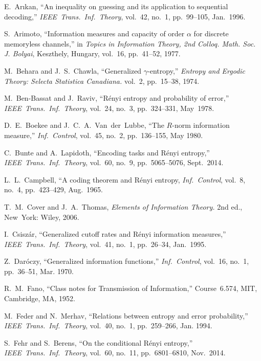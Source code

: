 \documentclass[conference, draftcls, onecolumn]{IEEEtran}
\theoremstyle{plain}
\begin{document}
\begin{thebibliography}{99}

E.~Ar{\i}kan,
``An inequality on guessing and its application to sequential decoding,''
\emph{IEEE\ Trans.\ Inf.\ Theory},
vol.~42, no.~1, pp.~99--105, Jan.~1996.

S.~Arimoto,
``Information measures and capacity of order $\alpha$ for discrete memoryless channels,''
in \emph{Topics in Information Theory, 2nd Colloq. Math. Soc. J. Bolyai},
Keszthely, Hungary, vol.~16, pp.~41--52, 1977.

M.~Behara and J.~S.~Chawla,
``Generalized $\gamma$-entropy,''
\emph{Entropy and Ergodic Theory: Selecta Statistica Canadiana.}
vol.~2, pp.~15--38, 1974.

M.~Ben-Bassat and J.~Raviv,
``R\'{e}nyi entropy and probability of error,''
\emph{IEEE\ Trans.\ Inf.\ Theory},
vol.~24, no.~3, pp.~324--331, May~1978.

D.~E.~Boekee and J.~C.~A.~Van~der~Lubbe,
``The $R$-norm information measure,''
\emph{Inf.\ Control},
vol.~45, no.~2, pp.~136--155, May 1980.

C.~Bunte and A.~Lapidoth,
``Encoding tasks and R\'{e}nyi entropy,''
\emph{IEEE\ Trans.\ Inf.\ Theory},
vol.~60, no.~9, pp.~5065--5076, Sept.~2014.

L.~L.~Campbell,
``A coding theorem and R\'{e}nyi entropy,
\emph{Inf.\ Control},
vol.~8, no.~4, pp.~423--429, Aug.~1965.

T.~M.~Cover and J.~A.~Thomas,
\emph{Elements of Information Theory.}
2nd ed., New~York: Wiley, 2006.

I.~Csisz\'{a}r,
``Generalized cutoff rates and R\'{e}nyi information measures,''
\emph{IEEE\ Trans.\ Inf.\ Theory},
vol.~41, no.~1, pp.~26--34, Jan.~1995.

Z.~Dar\'{o}czy,
``Generalized information functions,''
\emph{Inf.\ Control},
vol.~16, no.~1, pp.~36--51, Mar. 1970.

R.~M.~Fano,
``Class notes for Transmission of Information,''
Course~6.574, MIT, Cambridge, MA, 1952.

M.~Feder and N.~Merhav,
``Relations between entropy and error probability,''
\emph{IEEE\ Trans.\ Inf.\ Theory},
vol.~40, no.~1, pp.~259--266, Jan. 1994.

S.~Fehr and S.~Berens,
``On the conditional R\'{e}nyi entropy,''
\emph{IEEE\ Trans.\ Inf.\ Theory},
vol.~60, no.~11, pp.~6801--6810, Nov.~2014.


\end{thebibliography}
\end{document}
